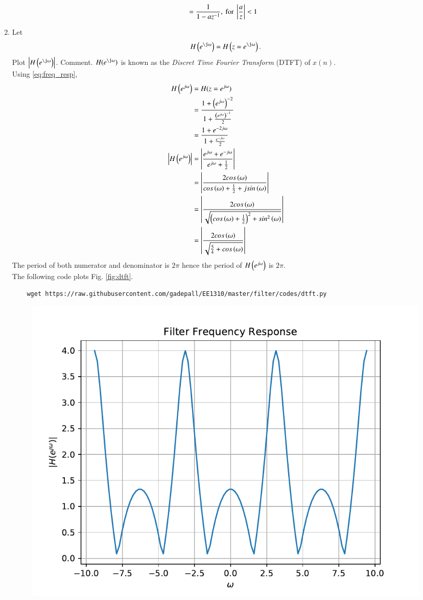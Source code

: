 \documentclass[journal,12pt,twocolumn]{IEEEtran}
\renewcommand\thesection{\arabic{section}}
\begin{document}
\begin{enumerate}[label=\thesection.\arabic*]
\begin{align}
	&=\frac{1}{1-az^{-1}}, \text{       for         } \left\vert\frac{a}{z}\right\vert<1
\end{align}
%
\item 
Let
\begin{equation}
	H\brak{e^{\j \omega}} = H\brak{z = e^{\j \omega}}.
\end{equation}
Plot $\abs{H\brak{e^{\j \omega}}}$.  Comment.  $H(e^{\j \omega})$ is
known as the {\em Discret Time Fourier Transform} (DTFT) of $x(n)$.
\\
\solution 
Using \eqref{eq:freq_resp},
\begin{align}
	H\left(e^{j\omega}\right)&=H(z=e^{j\omega})\\
	&=\frac{1+\left(e^{j\omega}\right)^{-2}}{1+\frac{\left(e^{j\omega}\right)^{-1}}{2}}\\
	&=\frac{1+e^{-2j\omega}}{1+\frac{e^{-j\omega}}{2}} \label{H}\\
	\left\vert H\left(e^{j\omega}\right)\right\vert&=\left\vert\frac{e^{j\omega}+e^{-j\omega}}{e^{j\omega}+\frac{1}{2}}\right\vert\\
	&=\left\vert\frac{2cos\left(\omega\right)}{cos\left(\omega\right)+\frac{1}{2}+jsin\left(\omega\right)}\right\vert\\
	&=\left\vert\frac{2cos\left(\omega\right)}{\sqrt{\left(cos\left(\omega\right)+\frac{1}{2}\right)^2+sin^2\left(\omega\right)}}\right\vert\label{H}\\
	&=\left\vert\frac{2cos\left(\omega\right)}{\sqrt{\frac{5}{4}+cos\left(\omega\right)}}\right\vert
\end{align}
The period of both numerator and denominator is $2\pi$ hence the period of $H\left(e^{j\omega}\right)$ is $2\pi$.\\
The following code plots Fig. \ref{fig:dtft}.
\begin{lstlisting}
	wget https://raw.githubusercontent.com/gadepall/EE1310/master/filter/codes/dtft.py
\end{lstlisting}
\begin{figure}[!ht]
	\centering
	\includegraphics[width=\columnwidth]{./figs/dtft}

\end{figure}
\end{enumerate}
\end{document}
